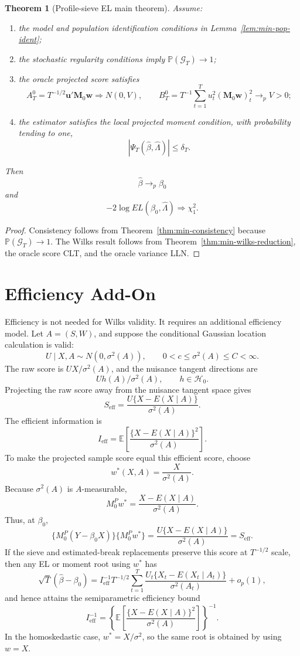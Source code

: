 \documentclass[12pt]{article}
\numberwithin{equation}{section}
\newtheorem{theorem}{Theorem}
\theoremstyle{definition}
\newcommand{\E}{\mathbb E}
\newcommand{\Pp}{\mathbb P}
\newcommand{\Hh}{\mathcal H}
\begin{document}
\begin{theorem}[Profile-sieve EL main theorem]
\label{thm:min-main}
Assume:
\begin{enumerate}[leftmargin=2em]
\item the model and population identification conditions in
Lemma~\ref{lem:min-pop-ident};
\item the stochastic regularity conditions imply \(\Pp(\mathcal G_T)\to1\);
\item the oracle projected score satisfies
\[
    A_T^0=T^{-1/2}\bm u'\bm M_0\bm w\Rightarrow N(0,V),
    \qquad
    B_T^0=T^{-1}\sum_{t=1}^Tu_t^2(\bm M_0\bm w)_t^2\to_p V>0;
\]
\item the estimator satisfies the local projected moment condition, with
probability tending to one,
\[
    |\Psi_T(\widehat\beta,\widehat\Lambda)|\le \delta_T.
\]
\end{enumerate}
Then
\[
    \widehat\beta\to_p\beta_0
\]
and
\[
    -2\log EL(\beta_0,\widehat\Lambda)\Rightarrow \chi_1^2.
\]
\end{theorem}

\begin{proof}
Consistency follows from Theorem~\ref{thm:min-consistency} because
\(\Pp(\mathcal G_T)\to1\). The Wilks result follows from
Theorem~\ref{thm:min-wilks-reduction}, the oracle score CLT, and the oracle
variance LLN.
\end{proof}

\section{Efficiency Add-On}

Efficiency is not needed for Wilks validity. It requires an additional
efficiency model. Let \(A=(S,W)\), and suppose the conditional Gaussian location
calculation is valid:
\[
    U\mid X,A\sim N(0,\sigma^2(A)),
    \qquad 0<c\le\sigma^2(A)\le C<\infty.
\]
The raw score is \(UX/\sigma^2(A)\), and the nuisance tangent directions are
\[
    Uh(A)/\sigma^2(A),\qquad h\in\Hh_0.
\]
Projecting the raw score away from the nuisance tangent space gives
\[
    S_{\mathrm{eff}}
    =
    \frac{U\{X-E(X\mid A)\}}{\sigma^2(A)}.
\]
The efficient information is
\[
    I_{\mathrm{eff}}
    =
    \E\left[
    \frac{\{X-E(X\mid A)\}^2}{\sigma^2(A)}
    \right].
\]
To make the projected sample score equal this efficient score, choose
\[
    w^*(X,A)=\frac{X}{\sigma^2(A)}.
\]
Because \(\sigma^2(A)\) is \(A\)-measurable,
\[
    M_0^Pw^*
    =
    \frac{X-E(X\mid A)}{\sigma^2(A)}.
\]
Thus, at \(\beta_0\),
\[
    \{M_0^P(Y-\beta_0X)\}\{M_0^Pw^*\}
    =
    \frac{U\{X-E(X\mid A)\}}{\sigma^2(A)}
    =
    S_{\mathrm{eff}}.
\]
If the sieve and estimated-break replacements preserve this score at
\(T^{-1/2}\) scale, then any EL or moment root using \(w^*\) has
\[
    \sqrt T(\widehat\beta-\beta_0)
    =
    I_{\mathrm{eff}}^{-1}T^{-1/2}\sum_{t=1}^T
    \frac{U_t\{X_t-E(X_t\mid A_t)\}}{\sigma^2(A_t)}
    +o_p(1),
\]
and hence attains the semiparametric efficiency bound
\[
    I_{\mathrm{eff}}^{-1}
    =
    \left\{
    \E\left[
    \frac{\{X-E(X\mid A)\}^2}{\sigma^2(A)}
    \right]
    \right\}^{-1}.
\]
In the homoskedastic case, \(w^*=X/\sigma^2\), so the same root is obtained by
using \(w=X\).
\end{document}
